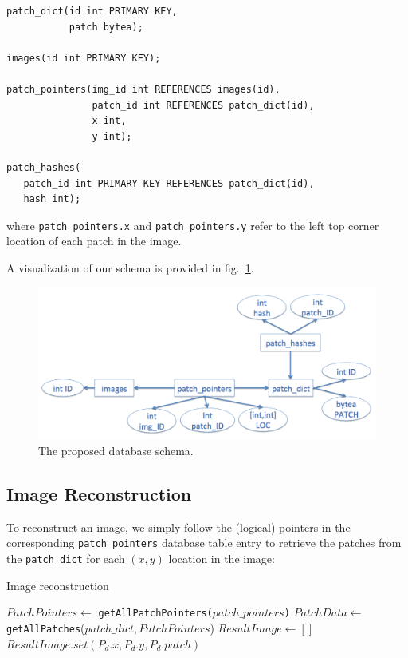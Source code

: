 \begin{verbatim}
patch_dict(id int PRIMARY KEY,
           patch bytea);

images(id int PRIMARY KEY);

patch_pointers(img_id int REFERENCES images(id),
               patch_id int REFERENCES patch_dict(id),
               x int,
               y int);

patch_hashes(
   patch_id int PRIMARY KEY REFERENCES patch_dict(id),
   hash int);
\end{verbatim}
where \texttt{patch\_pointers.x} and \texttt{patch\_pointers.y}
refer to the left top corner location of each patch in the image.

\noindent A visualization of our schema is provided in fig.~\ref{fig:schema}.

 \begin{figure}
\centering
\includegraphics[width=0.6\linewidth]{Figures/ERdiagram.png}
\caption{The proposed database schema.}
\label{fig:schema}
\end{figure}


\subsection{Image Reconstruction}\label{sec:reconst}

To reconstruct an image, we simply follow the (logical) pointers in the corresponding \texttt{patch\_pointers} database table entry to retrieve the patches from the \texttt{patch\_dict} for each $(x,y)$ location in the image:

\begin{algorithm}
    \caption{Image reconstruction}
    \label{alg:recon}
\begin{algorithmic}[1]
\State $PatchPointers \leftarrow $ \texttt{getAllPatchPointers($patch\_pointers$)}
\State $PatchData \leftarrow $ \texttt{getAllPatches}($patch\_dict, PatchPointers$)
\State $ResultImage \leftarrow []$
\State $ResultImage.set(P_{d}.x,P_{d}.y,P_{d}.patch)$
\EndFor
\vspace{3mm}
\end{algorithmic}
\end{algorithm}



